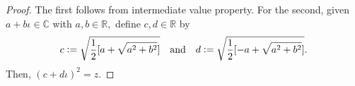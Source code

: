 \FTAprelim*\label{lem:FTAprelim2}
\begin{flushright}\hyperref[lem:FTAprelim]{\upsym}\end{flushright}
\begin{proof} 
    The first follows from intermediate value property. For the second, given $a + b \iota \in \mathbb{C}$ with $a, b \in \mathbb{R},$ define $c, d \in \mathbb{R}$ by
    \begin{equation*} 
        c \vcentcolon= \sqrt{\frac{1}{2}[a + \sqrt{a^2 + b^2}]} \quad\text{and}\quad d \vcentcolon= \sqrt{\frac{1}{2}[-a + \sqrt{a^2 + b^2}]}.
    \end{equation*}
    Then, $(c + d \iota)^2 = z.$
\end{proof}
\FTA*\label{thm:FTA2}
\begin{flushright}\hyperref[thm:FTA]{\upsym}\end{flushright}
